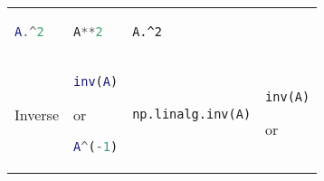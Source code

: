 \documentclass[10pt, landscape]{article}
\begin{document}
\begin{multicols}{2}
\begin{tabular}[]{@{}llll@{}}
\begin{minipage}[t]{0.22\columnwidth}
\begin{lstlisting}[language=Matlab]
A.^2
\end{lstlisting}
\strut
\end{minipage} & \begin{minipage}[t]{0.23\columnwidth}\raggedright\strut
\begin{lstlisting}[language=Python]
A**2
\end{lstlisting}
\strut
\end{minipage} & \begin{minipage}[t]{0.20\columnwidth}\raggedright\strut
\begin{lstlisting}
A.^2
\end{lstlisting}
\strut
\end{minipage}\tabularnewline
\begin{minipage}[t]{0.23\columnwidth}\raggedright\strut
Inverse\strut
\end{minipage} & \begin{minipage}[t]{0.22\columnwidth}\raggedright\strut
\begin{lstlisting}[language=Matlab]
inv(A)
\end{lstlisting}

or

\begin{lstlisting}[language=Matlab]
A^(-1)
\end{lstlisting}
\strut
\end{minipage} & \begin{minipage}[t]{0.23\columnwidth}\raggedright\strut
\begin{lstlisting}[language=Python]
np.linalg.inv(A)
\end{lstlisting}
\strut
\end{minipage} & \begin{minipage}[t]{0.20\columnwidth}\raggedright\strut
\begin{lstlisting}
inv(A)
\end{lstlisting}

or


\end{minipage}
\end{tabular}
\end{multicols}
\end{document}
